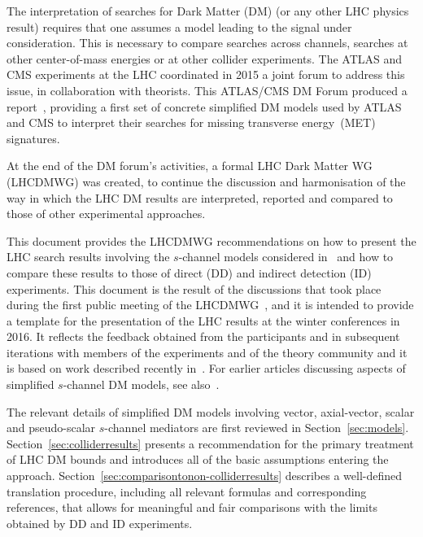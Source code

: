 
The interpretation of searches for Dark Matter (DM) (or any other LHC
physics result) requires that one assumes a model leading to the
signal under consideration. This is necessary to compare searches across channels, searches at other center-of-mass energies or at other collider
experiments. The ATLAS and CMS experiments at the LHC coordinated
in 2015 a joint forum to address this issue, in collaboration with
theorists. This ATLAS/CMS DM Forum produced 
a report~\cite{Abercrombie:2015wmb}, providing a first set of concrete simplified DM models used by
ATLAS and CMS to interpret their searches for missing transverse
energy~(MET) signatures.

At the end of the DM forum's activities, a formal LHC Dark Matter WG
(LHCDMWG) was created, to continue the discussion and harmonisation of the way
in which the LHC DM results are interpreted, reported and compared to those of
other experimental approaches. 


This document provides the LHCDMWG recommendations on how to present the LHC
search results involving the $s$-channel models considered
in~\cite{Abercrombie:2015wmb} and how to compare these results to
those of direct (DD) and indirect detection (ID) experiments. This
document is the result of the discussions that took place during the
first public meeting of the LHCDMWG~\cite{LHCDMWGWorkshop}, and it is
intended to provide a template for the presentation of the LHC results
at the winter conferences in 2016. It reflects the feedback obtained from
the participants and in subsequent iterations with members of the
experiments and of the theory community and it is based on work
described recently
in~\cite{Buchmueller:2014yoa,Abdallah:2014hon,Malik:2014ggr,Buckley:2014fba,Harris:2014hga,Haisch:2015ioa,Abdallah:2015ter}. For
earlier articles discussing aspects of simplified $s$-channel DM
models, see
also~\cite{Petriello:2008pu,Gershtein:2008bf,Dudas:2009uq,Bai:2010hh,Fox:2011pm,Goodman:2011jq,An:2012va,Frandsen:2012rk,Dreiner:2013vla,Cotta:2013jna,Buchmueller:2013dya,Abdullah:2014lla}.

The relevant details of simplified DM models involving vector,
axial-vector, scalar and pseudo-scalar $s$-channel mediators are first
reviewed in Section~\ref{sec:models}.
Section~\ref{sec:colliderresults} presents a recommendation for the
primary treatment of LHC DM bounds and introduces all of the basic
assumptions entering the approach.
Section~\ref{sec:comparisontonon-colliderresults} describes a
well-defined translation procedure, including all relevant formulas
and corresponding references, that allows for meaningful and fair
comparisons with the limits obtained by DD and ID experiments.








